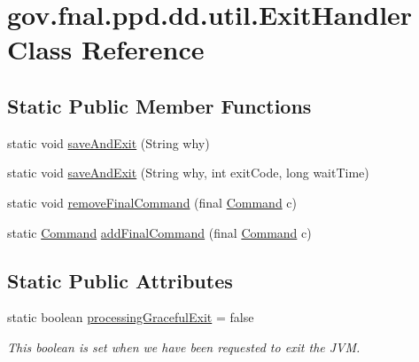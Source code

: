 \hypertarget{classgov_1_1fnal_1_1ppd_1_1dd_1_1util_1_1ExitHandler}{\section{gov.\-fnal.\-ppd.\-dd.\-util.\-Exit\-Handler Class Reference}
\label{classgov_1_1fnal_1_1ppd_1_1dd_1_1util_1_1ExitHandler}
}
\subsection*{Static Public Member Functions}
\begin{DoxyCompactItemize}
\item 
static void \hyperlink{classgov_1_1fnal_1_1ppd_1_1dd_1_1util_1_1ExitHandler_a32afc81cf237c5607fb04fa9955546c7}{save\-And\-Exit} (String why)
\item 
static void \hyperlink{classgov_1_1fnal_1_1ppd_1_1dd_1_1util_1_1ExitHandler_a055a4644b97c42d3d0b6e74222702cca}{save\-And\-Exit} (String why, int exit\-Code, long wait\-Time)
\item 
static void \hyperlink{classgov_1_1fnal_1_1ppd_1_1dd_1_1util_1_1ExitHandler_a76ec6ac2d9ae8b8129d1874ea9c1ee7a}{remove\-Final\-Command} (final \hyperlink{interfacegov_1_1fnal_1_1ppd_1_1dd_1_1util_1_1Command}{Command} c)
\item 
static \hyperlink{interfacegov_1_1fnal_1_1ppd_1_1dd_1_1util_1_1Command}{Command} \hyperlink{classgov_1_1fnal_1_1ppd_1_1dd_1_1util_1_1ExitHandler_ab1121c81909800f4ef6fb5de3448f9d9}{add\-Final\-Command} (final \hyperlink{interfacegov_1_1fnal_1_1ppd_1_1dd_1_1util_1_1Command}{Command} c)
\end{DoxyCompactItemize}
\subsection*{Static Public Attributes}
\begin{DoxyCompactItemize}
\item 
static boolean \hyperlink{classgov_1_1fnal_1_1ppd_1_1dd_1_1util_1_1ExitHandler_af5fcde17179f855b66e49420fa8cac7d}{processing\-Graceful\-Exit} = false
\begin{DoxyCompactList}\small\item\em This boolean is set when we have been requested to exit the J\-V\-M. \end{DoxyCompactList}\end{DoxyCompactItemize}


